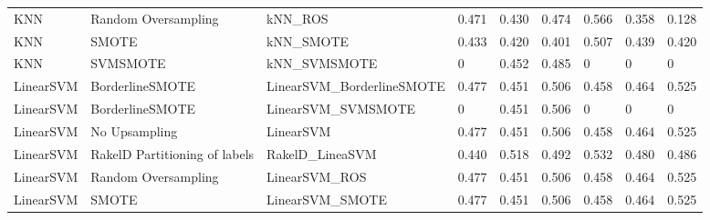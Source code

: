 \begin{tabular}{lllllllll}
                            KNN &           Random Oversampling &                                      kNN\_ROS & 0.471 &                     0.430 &                 0.474 &                  0.566 &                                   0.358 &     0.128 \\
                            KNN &                         SMOTE &                                    kNN\_SMOTE & 0.433 &                     0.420 &                 0.401 &                  0.507 &                                   0.439 &     0.420 \\
                            KNN &                      SVMSMOTE &                                 kNN\_SVMSMOTE &     0 &                     0.452 &                 0.485 &                      0 &                                       0 &         0 \\
                      LinearSVM &               BorderlineSMOTE &                    LinearSVM\_BorderlineSMOTE & 0.477 &                     0.451 &                 0.506 &                  0.458 &                                   0.464 &     0.525 \\
                      LinearSVM &               BorderlineSMOTE &                           LinearSVM\_SVMSMOTE &     0 &                     0.451 &                 0.506 &                      0 &                                       0 &         0 \\
                      LinearSVM &                 No Upsampling &                                    LinearSVM & 0.477 &                     0.451 &                 0.506 &                  0.458 &                                   0.464 &     0.525 \\
                      LinearSVM & RakelD Partitioning of labels &                              RakelD\_LineaSVM & 0.440 &                     0.518 &                 0.492 &                  0.532 &                                   0.480 &     0.486 \\
                      LinearSVM &           Random Oversampling &                                LinearSVM\_ROS & 0.477 &                     0.451 &                 0.506 &                  0.458 &                                   0.464 &     0.525 \\
                      LinearSVM &                         SMOTE &                              LinearSVM\_SMOTE & 0.477 &                     0.451 &                 0.506 &                  0.458 &                                   0.464 &     0.525 \\

\end{tabular}
